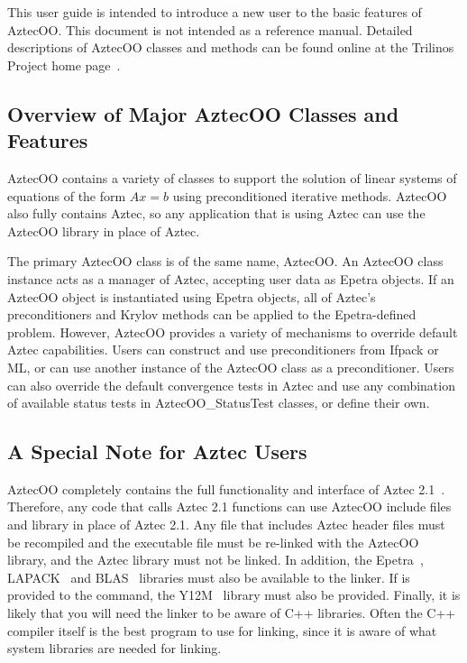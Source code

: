 \documentclass[12pt,relax]{AztecOOUserGuide}
\newcommand{\statustest}{AztecOO\_StatusTest}
\begin{document}
This user guide is intended to introduce a new user to the basic features of AztecOO.
This document is not intended as a reference
manual.  Detailed descriptions of AztecOO classes and methods can be
found online at the Trilinos Project home page~\cite{Trilinos-home-page}.


\subsection{Overview of Major AztecOO Classes and Features}

AztecOO contains a variety of classes to support the solution of
linear systems of equations of the form $Ax=b$ using preconditioned
iterative methods.  AztecOO also fully contains Aztec, so any application
that is using Aztec can use the AztecOO library in place of Aztec.

The primary AztecOO class is of the same name, AztecOO.  An AztecOO
class instance acts as a manager of Aztec, accepting user data as
Epetra objects.  If an AztecOO object is instantiated using Epetra
objects, all of Aztec's preconditioners and Krylov methods can be
applied to the Epetra-defined problem.  However, AztecOO provides a
variety of mechanisms to override default Aztec capabilities.  Users
can construct and use preconditioners from Ifpack or ML, or can use
another instance of the AztecOO class as a preconditioner.  Users can
also override the default convergence tests in Aztec and use any
combination of available status tests in \statustest{} classes,
or define their own.

\subsection{A Special Note for Aztec Users}

AztecOO completely contains the full functionality and interface of
Aztec 2.1~\cite{Aztec2.1}.  Therefore, any code that calls Aztec 2.1 functions
can use AztecOO include files and library in place of Aztec 2.1.   Any file
that includes Aztec header files must be recompiled and the executable file must
be re-linked with the AztecOO library, and the Aztec library must not be linked.
In addition, the Epetra~\cite{Epetra-home-page},
LAPACK~\cite{lapack} and BLAS~\cite{BLAS1, BLAS2, BLAS3}
libraries must also be available to the linker.
If  is
provided to the  command,
the Y12M~\cite{y12m} library must also be provided.
Finally, it is likely that you
will need the linker to be aware of C++ libraries.  Often the C++ compiler itself
is the best program to use for linking, since it is aware of what system libraries
are needed for linking.
\end{document}
